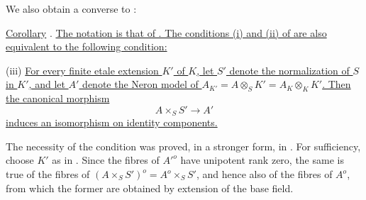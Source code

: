 We also obtain a converse to :

\medskip
\noindent
\underline{Corollary} . \underline{The notation is that of .  The
conditions (i) and (ii) of  are also equivalent to the following
condition:}

\smallskip
\noindent
(iii) \quad \underline{For every finite etale extension $K'$ of $K$, let
$S'$ denote the normalization of $S$ in $K'$, and let $A'$ denote the
Neron model of
$A_{K'}=A\otimes_SK'=A_K\otimes_KK'$.  Then the canonical morphism}
\[
 A\times_SS'\longrightarrow A'
\]
\underline{induces an isomorphism on identity components.}

The necessity of the condition was proved, in a stronger form, in .
For sufficiency, choose $K'$ as in .  Since the fibres of ${A'}^o$ have
unipotent rank zero, the same is true of the fibres of
$(A\times_SS')^o=A^o\times_SS'$, and hence also of the fibres of $A^o$,
from which the former are obtained by extension of the base field.
